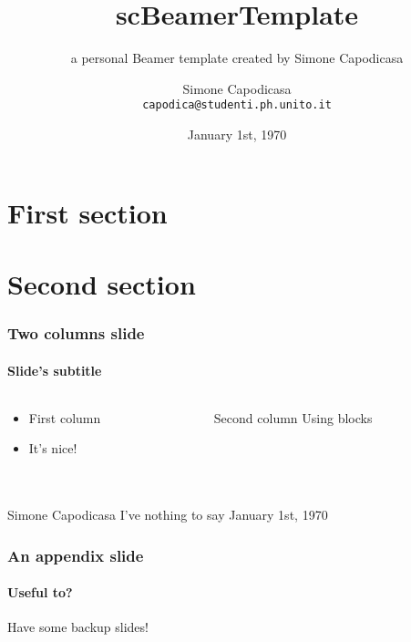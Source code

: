 \documentclass[handout]{beamer}
\title[scBeamerTemplate]{scBeamerTemplate}
\subtitle[my personal Beamer Template]{a personal Beamer template created by Simone Capodicasa}
\author[S. Capodicasa]{Simone Capodicasa\\[1ex]
	\scriptsize{\texttt{capodica@studenti.ph.unito.it}}
  	}
\institute[]{Università degli Studi di Torino}
\date[1/1/1970]{ January 1st, 1970}
\begin{document}
\begin{frame}
\titlepage
\end{frame}

\begin{frame}
		\frametitle{\contentsname}
		\tableofcontents
\end{frame}

\section{First section}

\begin{frame}
	\begin{center}
		\huge{\insertsection}
	\end{center}
\end{frame}

\section{Second section}

\begin{frame}
	\frametitle{Two columns slide}
	\framesubtitle{Slide's subtitle}
	\begin{columns}
		\begin{column}{0.5\textwidth}
			\begin{itemize}
				\item First column
				\item It's nice!
			\end{itemize}
		\end{column}
		\pause
		\begin{column}{0.5\textwidth}
			\begin{block}{Second column}
      			Using blocks
  			\end{block}
		\end{column}
	\end{columns}
\end{frame}

\section{}

\begin{frame}
	\frametitle{\refname}
   	\begin{thebibliography}{9}
   		 Simone Capodicasa
   		\newblock I've nothing to say
   		\newblock January 1st, 1970
   \end{thebibliography}
\end{frame}

\appendix

\begin{frame}
	\frametitle{An appendix slide}
	\framesubtitle{Useful to?}
	\begin{center}
		Have some backup slides!
	\end{center}
\end{frame}
\end{document}
